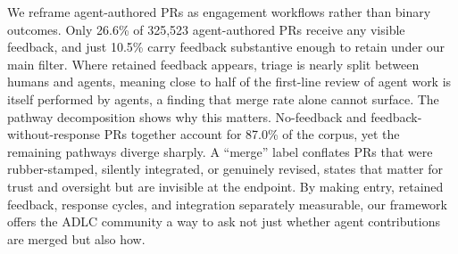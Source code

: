 \documentclass[10pt,conference,anonymous]{IEEEtran}
\begin{document}
We reframe agent-authored PRs as engagement workflows rather than binary outcomes. Only 26.6\% of 325,523 agent-authored PRs receive any visible feedback, and just 10.5\% carry feedback substantive enough to retain under our main filter. Where retained feedback appears, triage is nearly split between humans and agents, meaning close to half of the first-line review of agent work is itself performed by agents, a finding that merge rate alone cannot surface.
The pathway decomposition shows why this matters. No-feedback and feedback-without-response PRs together account for 87.0\% of the corpus, yet the remaining pathways diverge sharply. A ``merge'' label conflates PRs that were rubber-stamped, silently integrated, or genuinely revised, states that matter for trust and oversight but are invisible at the endpoint. By making entry, retained feedback, response cycles, and integration separately measurable, our framework offers the ADLC community a way to ask not just whether agent contributions are merged but also how.

\newpage


\end{document}
